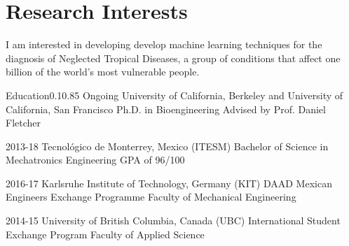 \documentclass{federico_cv}
\begin{document}
{}
{}


\section{Research Interests}
I am interested in developing develop machine learning techniques for the diagnosis of Neglected Tropical Diseases, a group of conditions that affect one billion of the world's most vulnerable people.


\begin{tblSection}{Education}{0.1}{0.85}
\degree
{Ongoing}
{University of California, Berkeley and University of California, San Francisco}
{Ph.D. in Bioengineering}
{Advised by Prof. Daniel Fletcher}

\degree
{2013-18}
{Tecnológico de Monterrey, Mexico (ITESM)}
{Bachelor of Science in Mechatronics Engineering}
{GPA of 96/100}

\degree
{2016-17}
{Karlsruhe Institute of Technology, Germany (KIT)}
{DAAD Mexican Engineers Exchange Programme}
{Faculty of Mechanical Engineering}

\degree
{2014-15}
{University of British Columbia, Canada (UBC)}
{International Student Exchange Program}
{Faculty of Applied Science}

\end{tblSection}


\let\thefootnote\relax{}\nocite{*}
\printbibliography[keyword={Publications},title={Publications},resetnumbers=true]
\end{document}
